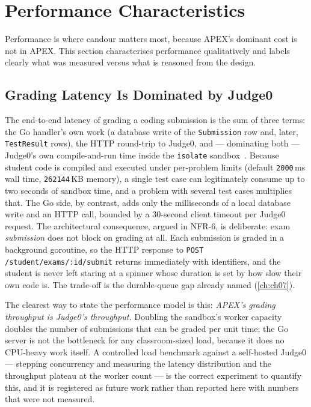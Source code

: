 \section{Performance Characteristics}
\label{sec:res-performance}

Performance is where candour matters most, because APEX's dominant cost is not in
APEX. This section characterises performance qualitatively and labels clearly what
was measured versus what is reasoned from the design.

\subsection{Grading Latency Is Dominated by Judge0}
\label{sec:res-latency}

The end-to-end latency of grading a coding submission is the sum of three terms: the
Go handler's own work (a database write of the \texttt{Submission} row and, later,
\texttt{TestResult} rows), the HTTP round-trip to Judge0, and --- dominating both ---
Judge0's own compile-and-run time inside the \texttt{isolate}
sandbox~\cite{judge0,isolate}. Because student code is compiled and executed under
per-problem limits (default \texttt{2000}\,ms wall time, \texttt{262144}\,KB memory),
a single test case can legitimately consume up to two seconds of sandbox time, and a
problem with several test cases multiplies that. The Go side, by contrast, adds only
the milliseconds of a local database write and an HTTP call, bounded by a 30-second
client timeout per Judge0 request. The architectural consequence, argued in NFR-6,
is deliberate: exam \emph{submission} does not block on grading at all. Each
submission is graded in a background goroutine, so the HTTP response to
\texttt{POST /student/exams/:id/submit} returns immediately with identifiers, and the
student is never left staring at a spinner whose duration is set by how slow their
own code is. The trade-off is the durable-queue gap already named (\cref{ch:ch07}).

The clearest way to state the performance model is this: \emph{APEX's grading
throughput is Judge0's throughput.} Doubling the sandbox's worker capacity doubles the
number of submissions that can be graded per unit time; the Go server is not the
bottleneck for any classroom-sized load, because it does no CPU-heavy work itself. A
controlled load benchmark against a self-hosted Judge0 --- stepping concurrency and
measuring the latency distribution and the throughput plateau at the worker count ---
is the correct experiment to quantify this, and it is registered as future work
rather than reported here with numbers that were not measured.

